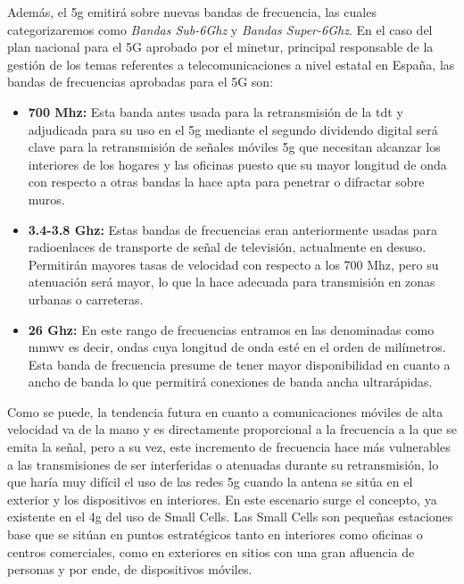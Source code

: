 \par Además, el \gls{5g} emitirá sobre nuevas bandas de frecuencia, las cuales categorizaremos como \textit{Bandas Sub-6Ghz} y \textit{Bandas Super-6Ghz}. En el caso del plan nacional para el 5G aprobado por el \gls{minetur}, principal responsable de la gestión de los temas referentes a telecomunicaciones a nivel estatal en España, las bandas de frecuencias aprobadas para el 5G son:
\begin{itemize}
\item\textbf{700 Mhz:} Esta banda antes usada para la retransmisión de la \gls{tdt} y adjudicada para su uso en el \gls{5g} mediante el segundo dividendo digital será clave para la retransmisión de señales móviles \gls{5g} que necesitan alcanzar los interiores de los hogares y las oficinas puesto que su mayor longitud de onda con respecto a otras bandas la hace apta para penetrar o difractar sobre muros.
\item\textbf{3.4-3.8 Ghz: }Estas bandas de frecuencias eran anteriormente usadas para radioenlaces de transporte de señal de televisión, actualmente en desuso. Permitirán mayores tasas de velocidad con respecto a los 700 Mhz, pero su atenuación será mayor, lo que la hace adecuada para transmisión en zonas urbanas o carreteras.
\item\textbf{26 Ghz: }En este rango de frecuencias entramos en las denominadas como \gls{mmwv} es decir, ondas cuya longitud de onda esté en el orden de milímetros. Esta banda de frecuencia presume de tener mayor disponibilidad en cuanto a ancho de banda lo que permitirá conexiones de banda ancha ultrarápidas.
\end{itemize}

\par Como se puede, la tendencia futura en cuanto a comunicaciones móviles de alta velocidad va de la mano y es directamente proporcional a la frecuencia a la que se emita la señal, pero a su vez, este incremento de frecuencia hace más vulnerables a las transmisiones de ser interferidas o atenuadas durante su retransmisión, lo que haría muy difícil el uso de las redes \gls{5g} cuando la antena se sitúa en el exterior y los dispositivos en interiores. En este escenario surge el concepto, ya existente en el \gls{4g} del uso de Small Cells. Las Small Cells son pequeñas estaciones base que se sitúan en puntos estratégicos tanto en interiores como oficinas o centros comerciales, como en exteriores en sitios con una gran afluencia de personas y por ende, de dispositivos móviles. 

